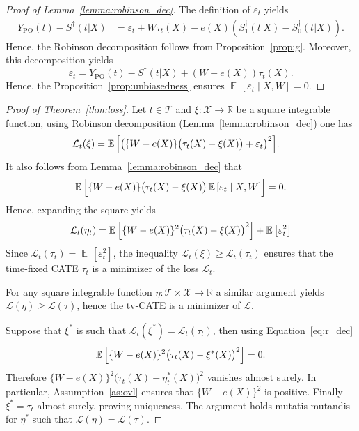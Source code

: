 \documentclass{article}
\DeclareMathOperator{\EX}{\mathbb{E}\,}
\newcommand{\R}{\mathbb{R}}
\begin{document}
\begin{proof}[Proof of Lemma~\ref{lemma:robinson_dec}]
The definition of $\varepsilon_t$ yields
\begin{align*}
Y_{\mathrm{PO}}(t) - S^\dag(t|X)&= \varepsilon_t + W \tau_t(X) - e(X)(S_1^\dagger(t|X) - S_0^\dagger(t|X)).
\end{align*}
Hence, the Robinson decomposition follows from Proposition~\ref{prop:g}. Moreover, this decomposition yields
\[ \varepsilon_t = Y_{\mathrm{PO}}(t) - S^\dagger(t|X) + (W-e(X))\tau_t(X).\]
Hence, the Proposition~\ref{prop:unbiasedness} ensures $\EX [\varepsilon_t \mid X,W] = 0$.
\end{proof}


\begin{proof}[Proof of Theorem~\ref{thm:loss}]
Let $t \in \mathcal{T}$ and $\xi : \mathcal{X} \to \R$ be a square integrable function, using Robinson decomposition (Lemma~\ref{lemma:robinson_dec}) one has
\begin{align*}
\mathcal{L}_t(\xi)&=\EX\Bigl[\big(\{W-e(X)\}\bigl(\tau_t(X)- \xi(X) \bigr)+\varepsilon_t\big)^{2}\Bigr].
\end{align*}
It also follows from Lemma~\ref{lemma:robinson_dec} that
\begin{align*}
\EX\Bigl[\{W-e(X)\}\bigl(\tau_t(X)- \xi(X)\bigr)\EX[\varepsilon_t\mid X,W]\Bigr] = 0.
\end{align*}
Hence, expanding the square yields
\begin{align}
\mathcal{L}_t(\eta_t) =\EX\Bigl[\{W-e(X)\}^{2}\bigl(\tau_t(X)-\xi(X)\bigr)^{2}\Bigr] + \EX\bigl[\varepsilon_t^2\bigr] \label{eq:r_dec}
\end{align}
Since $\mathcal{L}_t(\tau_t) = \EX[ \varepsilon_t^2]$, the inequality $\mathcal{L}_t(\xi) \geq \mathcal{L}_t(\tau_t)$
ensures that the time-fixed CATE $\tau_t$ is a minimizer of the loss $\mathcal{L}_t$.

For any square integrable function
$\eta: \mathcal{T} \times \mathcal{X} \to \R$ a similar argument yields $\mathcal{L}(\eta) \geq \mathcal{L}(\tau)$, hence
the tv-CATE is a minimizer of $\mathcal{L}$.


Suppose that $\xi^*$ is such that $\mathcal{L}_t(\xi^*) = \mathcal{L}_t(\tau_t)$, then using Equation~\eqref{eq:r_dec}
\begin{align*}
\EX\Bigl[\{W-e(X)\}^{2}\bigl(\tau_t(X)-\xi^*(X)\bigr)^{2}\Bigr] = 0.
\end{align*}
Therefore $ \{W-e(X)\}^{2}\bigl(\tau_t(X)-\eta_t^*(X)\bigr)^{2}$ vanishes almost surely. In particular, Assumption~\ref{as:ovl} ensures that $\{W-e(X)\}^{2}$ is positive. Finally $\xi^* = \tau_t$ almost surely, proving uniqueness. The argument holds mutatis mutandis for $\eta^*$ such that $\mathcal{L}(\eta) = \mathcal{L}(\tau)$.
\end{proof}
\end{document}
